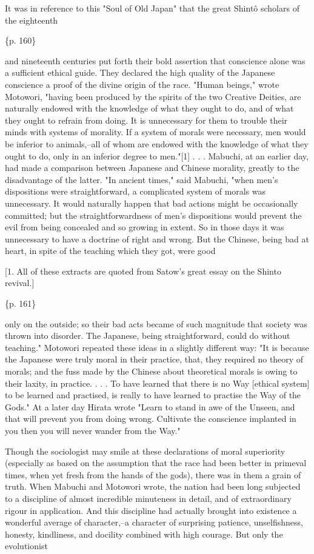 It was in reference to this "Soul of Old Japan" that the great Shintô scholars of the eighteenth

\{p. 160\}

and nineteenth centuries put forth their bold assertion that conscience alone was a sufficient ethical guide. They declared the high quality of the Japanese conscience a proof of the divine origin of the race. "Human beings," wrote Motowori, "having been produced by the spirits of the two Creative Deities, are naturally endowed with the knowledge of what they ought to do, and of what they ought to refrain from doing. It is unnecessary for them to trouble their minds with systems of morality. If a system of morals were necessary, men would be inferior to animals,--all of whom are endowed with the knowledge of what they ought to do, only in an inferior degree to men."[1] . . . Mabuchi, at an earlier day, had made a comparison between Japanese and Chinese morality, greatly to the disadvantage of the latter. "In ancient times," said Mabuchi, "when men's dispositions were straightforward, a complicated system of morals was unnecessary. It would naturally happen that bad actions might be occasionally committed; but the straightforwardness of men's dispositions would prevent the evil from being concealed and so growing in extent. So in those days it was unnecessary to have a doctrine of right and wrong. But the Chinese, being bad at heart, in spite of the teaching which they got, were good

[1. All of these extracts are quoted from Satow's great essay on the Shinto revival.]

\{p. 161\}

only on the outside; so their bad acts became of such magnitude that society was thrown into disorder. The Japanese, being straightforward, could do without teaching." Motowori repeated these ideas in a slightly different way: "It is because the Japanese were truly moral in their practice, that, they required no theory of morals; and the fuss made by the Chinese about theoretical morals is owing to their laxity, in practice. . . . To have learned that there is no Way [ethical system] to be learned and practised, is really to have learned to practise the Way of the Gods." At a later day Hirata wrote "Learn to stand in awe of the Unseen, and that will prevent you from doing wrong. Cultivate the conscience implanted in you then you will never wander from the Way."

Though the sociologist may smile at these declarations of moral superiority (especially as based on the assumption that the race had been better in primeval times, when yet fresh from the hands of the gods), there was in them a grain of truth. When Mabuchi and Motowori wrote, the nation had been long subjected to a discipline of almost incredible minuteness in detail, and of extraordinary rigour in application. And this discipline had actually brought into existence a wonderful average of character,--a character of surprising patience, unselfishness, honesty, kindliness, and docility combined with high courage. But only the evolutionist

